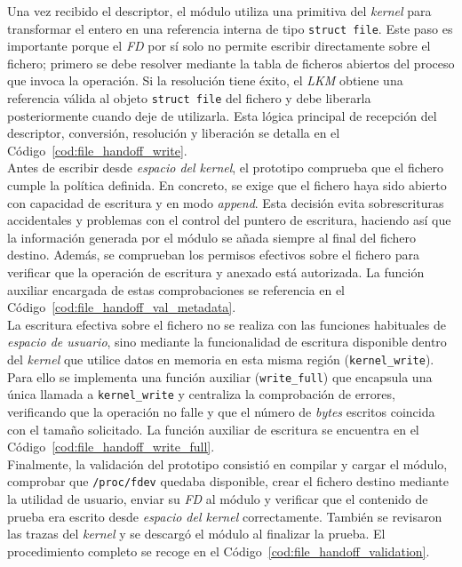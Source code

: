 Una vez recibido el descriptor, el módulo utiliza una primitiva del \textit{kernel} para transformar el entero en una referencia interna de tipo \texttt{struct file}.
Este paso es importante porque el \textit{FD} por sí solo no permite escribir directamente sobre el fichero; primero se debe resolver mediante la tabla de ficheros abiertos del proceso que invoca la operación.
Si la resolución tiene éxito, el \textit{LKM} obtiene una referencia válida al objeto \texttt{struct file} del fichero y debe liberarla posteriormente cuando deje de utilizarla.
Esta lógica principal de recepción del descriptor, conversión, resolución y liberación se detalla en el Código~\ref{cod:file_handoff_write}.\\

Antes de escribir desde \textit{espacio del kernel}, el prototipo comprueba que el fichero cumple la política definida.
En concreto, se exige que el fichero haya sido abierto con capacidad de escritura y en modo \textit{append}.
Esta decisión evita sobrescrituras accidentales y problemas con el control del puntero de escritura, haciendo así que la información generada por el módulo se añada siempre al final del fichero destino.
Además, se comprueban los permisos efectivos sobre el fichero para verificar que la operación de escritura y anexado está autorizada.
La función auxiliar encargada de estas comprobaciones se referencia en el Código~\ref{cod:file_handoff_val_metadata}.\\

La escritura efectiva sobre el fichero no se realiza con las funciones habituales de \textit{espacio de usuario}, sino mediante la funcionalidad de escritura disponible dentro del \textit{kernel} que utilice datos en memoria en esta misma región (\verb|kernel_write|).
Para ello se implementa una función auxiliar (\verb|write_full|) que encapsula una única llamada a \verb|kernel_write| y centraliza la comprobación de errores, verificando que la operación no falle y que el número de \textit{bytes} escritos coincida con el tamaño solicitado.
La función auxiliar de escritura se encuentra en el Código~\ref{cod:file_handoff_write_full}.\\

Finalmente, la validación del prototipo consistió en compilar y cargar el módulo, comprobar que \texttt{/proc/fdev} quedaba disponible, crear el fichero destino mediante la utilidad de usuario, enviar su \textit{FD} al módulo y verificar que el contenido de prueba era escrito desde \textit{espacio del kernel} correctamente.
También se revisaron las trazas del \textit{kernel} y se descargó el módulo al finalizar la prueba.
El procedimiento completo se recoge en el Código~\ref{cod:file_handoff_validation}.\\

